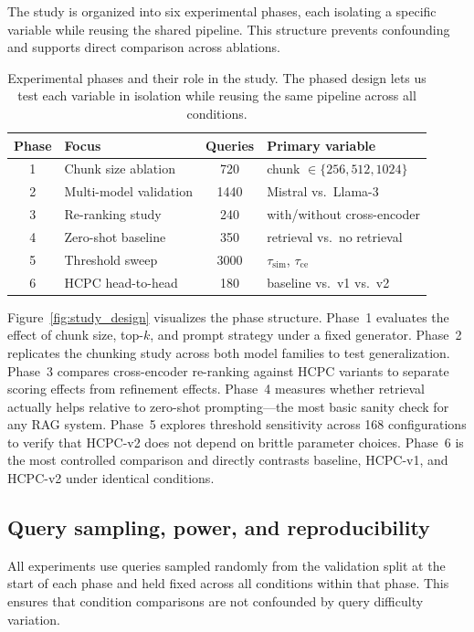 The study is organized into six experimental phases, each isolating a
specific variable while reusing the shared pipeline. This structure
prevents confounding and supports direct comparison across ablations.

\begin{table}[!htb]
\centering
\caption{Experimental phases and their role in the study. The phased design
lets us test each variable in isolation while reusing the same pipeline
across all conditions.}
\label{tab:phases}
\small
\begin{tabular}{clcl}
\toprule
Phase & Focus & Queries & Primary variable \\
\midrule
1 & Chunk size ablation    & 720  & chunk $\in \{256, 512, 1024\}$ \\
2 & Multi-model validation & 1440 & Mistral vs.\ Llama-3 \\
3 & Re-ranking study       & 240  & with/without cross-encoder \\
4 & Zero-shot baseline     & 350  & retrieval vs.\ no retrieval \\
5 & Threshold sweep        & 3000 & $\tau_{\text{sim}}$, $\tau_{\text{ce}}$ \\
6 & HCPC head-to-head      & 180  & baseline vs.\ v1 vs.\ v2 \\
\bottomrule
\end{tabular}
\end{table}


Figure~\ref{fig:study_design} visualizes the phase structure.
Phase~1 evaluates the effect of chunk size, top-$k$, and prompt strategy
under a fixed generator. Phase~2 replicates the chunking study across both
model families to test generalization. Phase~3 compares cross-encoder
re-ranking against HCPC variants to separate scoring effects from refinement
effects. Phase~4 measures whether retrieval actually helps relative to
zero-shot prompting---the most basic sanity check for any RAG system.
Phase~5 explores threshold sensitivity across 168 configurations to verify
that HCPC-v2 does not depend on brittle parameter choices. Phase~6 is the
most controlled comparison and directly contrasts baseline, HCPC-v1, and
HCPC-v2 under identical conditions.

\subsection{Query sampling, power, and reproducibility}

All experiments use queries sampled randomly from the validation split at the
start of each phase and held fixed across all conditions within that phase.
This ensures that condition comparisons are not confounded by query
difficulty variation.

